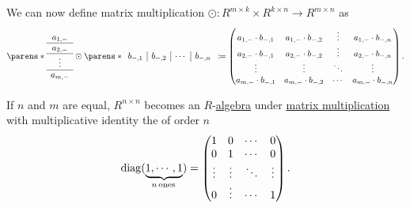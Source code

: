 \begin{proposition}
\begin{thmenum}
    We can now define matrix multiplication \( \odot: R^{m \times k} \times R^{k \times n} \to R^{m \times n} \) as
    \begin{equation*}
     \parens*
       {
         \begin{array}{c}
            a_{1,-} \\
            \hline
            a_{2,-} \\
            \hline
            \vdots \\
            \hline
            a_{m,-}
          \end{array}
        }
      \odot
      \parens*
        {
          \begin{array}{c|c|c|c}
            b_{-,1} & b_{-,2} & \cdots & b_{-,n}
          \end{array}
        }
      \coloneqq
      \begin{pmatrix}
        a_{1,-} \cdot b_{-,1} & a_{1,-} \cdot b_{-,2} & \vdots & a_{1,-} \cdot b_{-,n} \\
        a_{2,-} \cdot b_{-,1} & a_{2,-} \cdot b_{-,2} & \vdots & a_{2,-} \cdot b_{-,n} \\
        \vdots                & \vdots                & \ddots & \vdots                \\
        a_{m,-} \cdot b_{-,1} & a_{m,-} \cdot b_{-,2} & \cdots & a_{m,-} \cdot b_{-,n}
      \end{pmatrix}.
    \end{equation*}

    If \( n \) and \( m \) are equal, \( R^{n \times n} \) becomes an \( R \)-\hyperref[def:algebra_over_semiring]{algebra} under \hyperref[def:matrix_algebra/matrix_multiplication]{matrix multiplication} with multiplicative identity the  of order \( n \)
    \begin{equation}\label{eq:def:matrix_algebra/matrix_multiplication/identity}
      \op{diag}(\underbrace{ 1, \cdots, 1 }_{n \T*{ones}})
      =
      \begin{pmatrix}
        1       & 0      & \cdots & 0      \\
        0       & 1      & \cdots & 0      \\
        \vdots  & \vdots & \ddots & \vdots \\
        0       & \vdots & \cdots & 1
      \end{pmatrix}.
    \end{equation}
  \end{thmenum}
\end{proposition}
